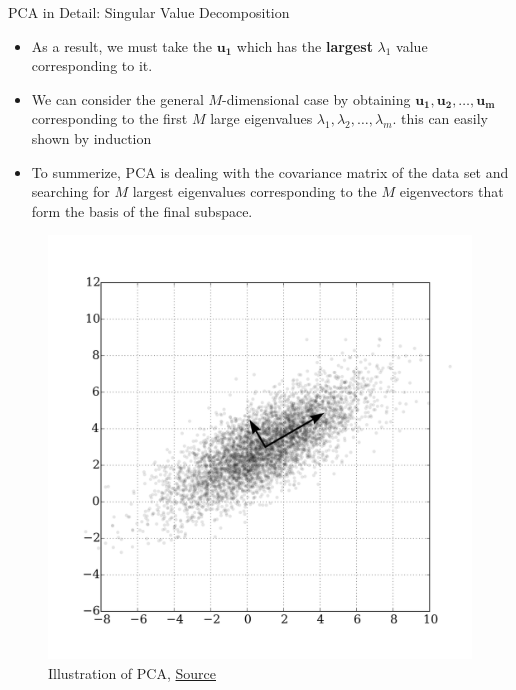 \documentclass[compress,oilve]{beamer}
\newcommand{\tc}[2]{
 \textcolor{#1}{\textbf{#2}}
}
\begin{document}
\begin{frame}{PCA in Detail: Singular Value Decomposition}
\begin{itemize}
\item As a result, we must take the $\mathbf{u_{1}}$ which has the \tc{keywords}{largest} $\lambda_{1} $ value corresponding to it.
\item We can consider the general $M$-dimensional case by obtaining $ \mathbf{u_{1}}, \mathbf{u_{2}}, \dots, \mathbf{u_{m}} $ corresponding to the first $M$ large eigenvalues $  \lambda_{1},  \lambda_{2}, \dots, \lambda_{m} $. this can easily shown by induction
\item To summerize, PCA is dealing with the covariance matrix of the data set and searching for $M$ largest eigenvalues corresponding to the $M$ eigenvectors that form the basis of the final subspace.
\end{itemize}
\begin{figure}
		\centering
		\includegraphics[scale=0.1]{5}
		\caption{Illustration of PCA, \href{	https://tinyurl.com/2q6ec2c6}{Source}}
	\end{figure}


\end{frame}
\end{document}
